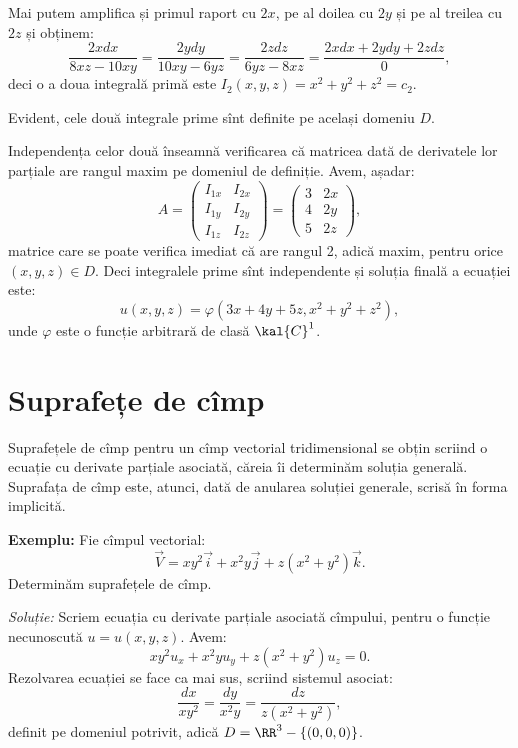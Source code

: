 Mai putem amplifica și primul raport cu $ 2x $, pe al doilea cu $ 2y $ și
pe al treilea cu $ 2z $ și obținem:
\[
  \dfrac{2xdx}{8xz - 10xy} = \dfrac{2ydy}{10xy - 6yz} = \dfrac{2zdz}{6yz - 8xz} = %
  \dfrac{2xdx + 2ydy + 2zdz}{0},
\]
deci o a doua integrală primă este $ I_2(x, y, z) = x^2 + y^2 + z^2 = c_2 $.

Evident, cele două integrale prime sînt definite pe același domeniu $ D $.

Independența celor două înseamnă verificarea că matricea dată de derivatele
lor par\-ți\-a\-le are rangul maxim pe domeniul de definiție. Avem, așadar:
\[
  A = \begin{pmatrix}
    I_{1x} & I_{2x} \\
    I_{1y} & I_{2y} \\
    I_{1z} & I_{2z}
  \end{pmatrix} = \begin{pmatrix}
    3 & 2x \\
    4 & 2y \\
    5 & 2z
  \end{pmatrix},
\]
matrice care se poate verifica imediat că are rangul 2, adică maxim, pentru orice
$(x,y,z) \in D $. Deci integralele prime sînt independente și soluția finală a
ecuației este:
\[
  u(x, y, z) = \varphi(3x + 4y + 5z, x^2 + y^2 + z^2),
\]
unde $ \varphi $ este o funcție arbitrară de clasă $ \kal{C}^1 $.


\section{Suprafețe de cîmp}

\indent\indent Suprafețele de cîmp pentru un cîmp vectorial tridimensional
se obțin scriind o ecuație cu derivate parțiale asociată, căreia îi determinăm
soluția generală. Suprafața de cîmp este, atunci, dată de anularea soluției
generale, scrisă în forma implicită.

\textbf{Exemplu:} Fie cîmpul vectorial:
\[
  \vec{V} = xy^2 \vec{i} + x^2y \vec{j} + z(x^2 + y^2) \vec{k}.
\]
Determinăm suprafețele de cîmp.

\emph{Soluție:} Scriem ecuația cu derivate parțiale asociată cîmpului,
pentru o funcție necunoscută $ u = u(x, y, z) $. Avem:
\[
  xy^2 u_x + x^2y u_y + z(x^2 + y^2)u_z = 0. 
\]
Rezolvarea ecuației se face ca mai sus, scriind sistemul asociat:
\[
  \dfrac{dx}{xy^2} = \dfrac{dy}{x^2y} = \dfrac{dz}{z(x^2 + y^2)},
\]
definit pe domeniul potrivit, adică $ D = \RR^3 - \{(0, 0, 0)\}$.

